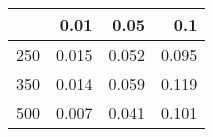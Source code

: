 % 
\begin{tabular}{rrrr}
  \hline
 & 0.01 & 0.05 & 0.1 \\ 
  \hline
250 & 0.015 & 0.052 & 0.095 \\ 
  350 & 0.014 & 0.059 & 0.119 \\ 
  500 & 0.007 & 0.041 & 0.101 \\ 
   \hline
\end{tabular}
